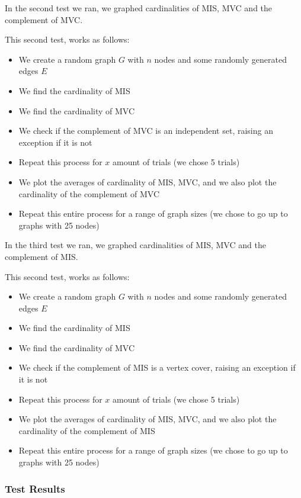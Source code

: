 \documentclass[12pt]{article}
\begin{document}
In the second test we ran, we graphed cardinalities of MIS, MVC and the complement of MVC.

This second test, works as follows:

\begin{itemize}
    \item We create a random graph $G$ with $n$ nodes and some randomly generated edges $E$
    \item We find the cardinality of MIS
    \item We find the cardinality of MVC
    \item We check if the complement of MVC is an independent set, raising an exception if it is not
    \item Repeat this process for $x$ amount of trials (we chose 5 trials)
    \item We plot the averages of cardinality of MIS, MVC, and we also plot the cardinality of the complement of MVC
    \item Repeat this entire process for a range of graph sizes (we chose to go up to graphs with 25 nodes)
\end{itemize}

In the third test we ran, we graphed cardinalities of MIS, MVC and the complement of MIS.

This second test, works as follows:

\begin{itemize}
    \item We create a random graph $G$ with $n$ nodes and some randomly generated edges $E$
    \item We find the cardinality of MIS
    \item We find the cardinality of MVC
    \item We check if the complement of MIS is a vertex cover, raising an exception if it is not
    \item Repeat this process for $x$ amount of trials (we chose 5 trials)
    \item We plot the averages of cardinality of MIS, MVC, and we also plot the cardinality of the complement of MIS
    \item Repeat this entire process for a range of graph sizes (we chose to go up to graphs with 25 nodes)
\end{itemize}

\newpage
\subsubsection{Test Results}
\end{document}
